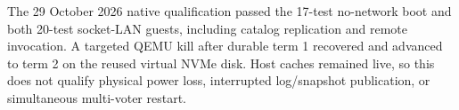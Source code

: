 The 29 October 2026 native qualification passed the 17-test no-network boot
and both 20-test socket-LAN guests, including catalog replication and remote
invocation.  A targeted QEMU kill after durable term 1 recovered and advanced
to term 2 on the reused virtual NVMe disk.  Host caches remained live, so this
does not qualify physical power loss, interrupted log/snapshot publication,
or simultaneous multi-voter restart.

\endinput

